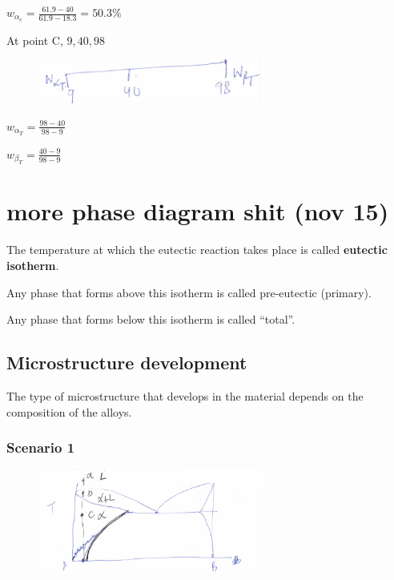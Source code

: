 \documentclass{article}
\begin{document}
$w_{\alpha_e} = \frac{61.9-40}{61.9-18.3} = 50.3\%$

At point C, $9, 40, 98$

\begin{figure}[h!]
	\centering
	\includegraphics[width=0.66\textwidth]{assets/0ec92081.png}
\end{figure}

$w_{\alpha_T} = \frac{98-40}{98-9}$

$w_{\beta_T} = \frac{40-9}{98-9}$

\section{more phase diagram shit (nov 15)}

The temperature at which the eutectic reaction takes place is called \textbf{eutectic isotherm}.

Any phase that forms above this isotherm is called pre-eutectic (primary).

Any phase that forms below this isotherm is called ``total''.

\subsection{Microstructure development}

The type of microstructure that develops in the material depends on the composition of the alloys.

\subsubsection{Scenario 1}

\begin{figure}[h!]
	\centering
	\includegraphics[width=0.66\textwidth]{assets/bfaf63be.png}
\end{figure}   
\end{document}
